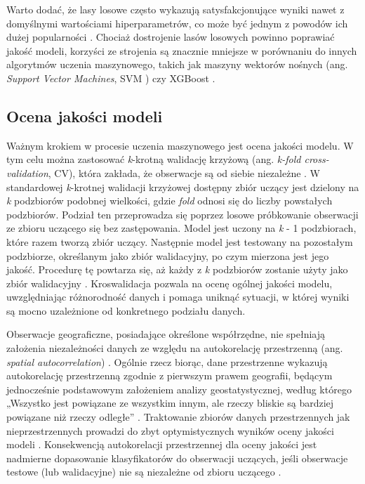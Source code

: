 \documentclass{amuthesis}
\begin{document}
Warto dodać, że lasy losowe często wykazują satysfakcjonujące wyniki
nawet z domyślnymi wartościami hiperparametrów, co może być jednym z
powodów ich dużej popularności \autocite{lovelace_2019_geocomputation}.
Chociaż dostrojenie lasów losowych powinno poprawiać jakość modeli,
korzyści ze strojenia są znacznie mniejsze w porównaniu do innych
algorytmów uczenia maszynowego, takich jak maszyny wektorów nośnych
(ang. \emph{Support Vector Machines}, SVM \autocite{svm})
\autocite{probst_2019_hyperparameters} czy XGBoost \autocite{xgboost}.

\hypertarget{sec-model-quality-assessment}{%
\subsection{Ocena jakości modeli}\label{sec-model-quality-assessment}}

Ważnym krokiem w procesie uczenia maszynowego jest ocena jakości modelu.
W tym celu można zastosować \emph{k}-krotną walidację krzyżową (ang.
\emph{k-fold cross-validation}, CV), która zakłada, że obserwacje są od
siebie niezależne \autocite{pohjankukka_2017_scv}. W standardowej
\emph{k}-krotnej walidacji krzyżowej dostępny zbiór uczący jest dzielony
na \emph{k} podzbiorów podobnej wielkości, gdzie \emph{fold} odnosi się
do liczby powstałych podzbiorów. Podział ten przeprowadza się poprzez
losowe próbkowanie obserwacji ze zbioru uczącego się bez zastępowania.
Model jest uczony na \emph{k} - 1 podzbiorach, które razem tworzą zbiór
uczący. Następnie model jest testowany na pozostałym podzbiorze,
określanym jako zbiór walidacyjny, po czym mierzona jest jego jakość.
Procedurę tę powtarza się, aż każdy z \emph{k} podzbiorów zostanie użyty
jako zbiór walidacyjny \autocite{berrar_2018_cv}. Kroswalidacja pozwala
na ocenę ogólnej jakości modelu, uwzględniając różnorodność danych i
pomaga uniknąć sytuacji, w której wyniki są mocno uzależnione od
konkretnego podziału danych.

Obserwacje geograficzne, posiadające określone współrzędne, nie
spełniają założenia niezależności danych ze względu na autokorelację
przestrzenną (ang. \emph{spatial autocorrelation})
\autocite{pohjankukka_2017_scv}. Ogólnie rzecz biorąc, dane przestrzenne
wykazują autokorelację przestrzenną zgodnie z pierwszym prawem
geografii, będącym jednocześnie podstawowym założeniem analizy
geostatystycznej, według którego „Wszystko jest powiązane ze wszystkim
innym, ale rzeczy bliskie są bardziej powiązane niż rzeczy odległe''
\autocite{tobler_1970_first_law_of_geography}. Traktowanie zbiorów
danych przestrzennych jak nieprzestrzennych prowadzi do zbyt
optymistycznych wyników oceny jakości modeli
\autocite{brenning_2005_scv}. Konsekwencją autokorelacji przestrzennej
dla oceny jakości jest nadmierne dopasowanie klasyfikatorów do
obserwacji uczących, jeśli obserwacje testowe (lub walidacyjne) nie są
niezależne od zbioru uczącego \autocite{brenning_2012_scv}.
\end{document}
